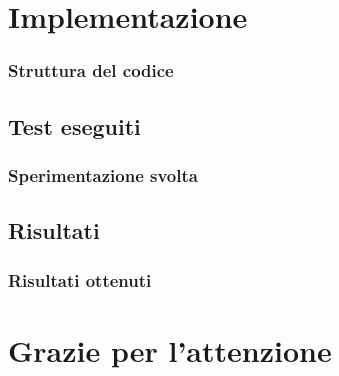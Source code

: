 \documentclass[10pt]{beamer}
\begin{document}
\section{Implementazione}
\begin{frame}
  \frametitle{Struttura del codice}

  

\end{frame}
\subsection{Test eseguiti}
\begin{frame}
  \frametitle{Sperimentazione svolta}

  

\end{frame}
\subsection{Risultati}
\begin{frame}
  \frametitle{Risultati ottenuti}

  

\end{frame}

\section*{Grazie per l'attenzione}
\end{document}
